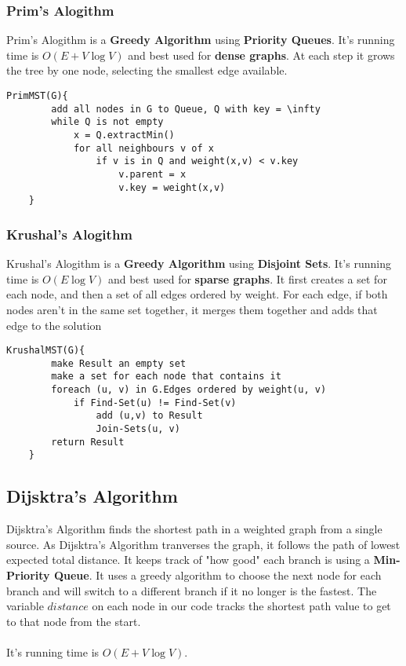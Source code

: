 \documentclass{article}
\begin{document}
	\subsubsection{Prim's Alogithm}
	Prim's Alogithm is a {\bf Greedy Algorithm} using {\bf Priority Queues}. It's running time is $O(E + V \log V)$ and best used for {\bf dense graphs}. At each step it grows the tree by one node, selecting the smallest edge available.

	\begin{lstlisting}[style=pseudo]
	PrimMST(G){
		add all nodes in G to Queue, Q with key = \infty
		while Q is not empty
			x = Q.extractMin()
			for all neighbours v of x
				if v is in Q and weight(x,v) < v.key
					v.parent = x
					v.key = weight(x,v)
	}
	\end{lstlisting}


	\subsubsection{Krushal's Alogithm}
	Krushal's Alogithm is a {\bf Greedy Algorithm} using {\bf Disjoint Sets}. It's running time is $O(E \log V)$ and best used for {\bf sparse graphs}. It first creates a set for each node, and then a set of all edges ordered by weight. For each edge, if both nodes aren't in the same set together, it merges them together and adds that edge to the solution

	\begin{lstlisting}[style=pseudo]
	KrushalMST(G){
		make Result an empty set
		make a set for each node that contains it
		foreach (u, v) in G.Edges ordered by weight(u, v)
			if Find-Set(u) != Find-Set(v)
				add (u,v) to Result
				Join-Sets(u, v)
		return Result
	}
	\end{lstlisting}



	\subsection{Dijsktra's Algorithm}

	Dijsktra's Algorithm finds the shortest path in a weighted graph from a single source. As Dijsktra's Algorithm tranverses the graph, it follows the path of lowest expected total distance. It keeps track of "how good" each branch is using a {\bf Min-Priority Queue}. It uses a greedy algorithm to choose the next node for each branch and will switch to a different branch if it no longer is the fastest. The variable $distance$ on each node in our code tracks the shortest path value to get to that node from the start.
	\\ \\
	It's running time is $O(E + V \log V)$.
\end{document}
